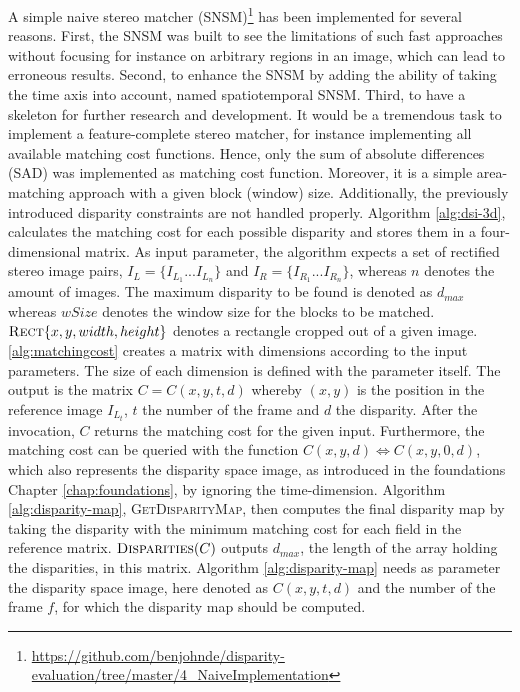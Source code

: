 A simple naive stereo matcher (SNSM)\footnote{\url{https://github.com/benjohnde/disparity-evaluation/tree/master/4_NaiveImplementation}} has been implemented for several reasons.
First, the SNSM was built to see the limitations of such fast approaches without focusing for instance on arbitrary regions in an image, which can lead to erroneous results.
Second, to enhance the SNSM by adding the ability of taking the time axis into account, named spatiotemporal SNSM.
Third, to have a skeleton for further research and development.
It would be a tremendous task to implement a feature-complete stereo matcher, for instance implementing all available matching cost functions.
Hence, only the sum of absolute differences (SAD) was implemented as matching cost function.
Moreover, it is a simple area-matching approach with a given block (window) size.
Additionally, the previously introduced disparity constraints are not handled properly.
\newline\newline\noindent Algorithm \ref{alg:dsi-3d}, calculates the matching cost for each possible disparity and stores them in a four-dimensional matrix.
As input parameter, the algorithm expects a set of rectified stereo image pairs, $I_L=\{I_{L_{1}}...I_{L_{n}}\}$ and $I_R=\{I_{R_{1}}...I_{R_{n}}\}$, whereas $n$ denotes the amount of images.
The maximum disparity to be found is denoted as $d_{max}$ whereas $wSize$ denotes the window size for the blocks to be matched.
$\textsc{Rect}\{x,y,width,height\}$ denotes a rectangle cropped out of a given image.
\ref{alg:matchingcost} creates a matrix with dimensions according to the input parameters.
The size of each dimension is defined with the parameter itself.
The output is the matrix $C = C(x,y,t,d)$ whereby $(x,y)$ is the position in the reference image $I_{L_{t}}$, $t$ the number of the frame and $d$ the disparity.
After the invocation, $C$ returns the matching cost for the given input.
Furthermore, the matching cost can be queried with the function $C(x,y,d) \iff C(x,y,0,d)$, which also represents the disparity space image, as introduced in the foundations Chapter \ref{chap:foundations}, by ignoring the time-dimension.
Algorithm \ref{alg:disparity-map}, \textsc{GetDisparityMap}, then computes the final disparity map by taking the disparity with the minimum matching cost for each field in the reference matrix.
$\textsc{Disparities}(C)$ outputs $d_{max}$, the length of the array holding the disparities, in this matrix.
Algorithm \ref{alg:disparity-map} needs as parameter the disparity space image, here denoted as $C(x,y,t,d)$ and the number of the frame $f$, for which the disparity map should be computed.

